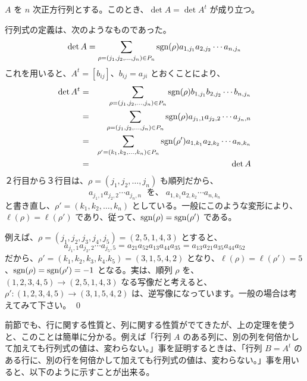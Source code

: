 \begin{thm} \label{thm:detoftranspose}
$A$ を $n$ 次正方行列とする。このとき、$\det A = \det A^t$ が成り立つ。
\end{thm}
\proof
行列式の定義は、次のようなものであった。
$$\det A = \sum_{\rho = (j_1,j_2,\ldots,j_n)\in P_n} \mbox{{\rm sgn}}(\rho)a_{1,j_1}a_{2,j_2}\cdots a_{n,j_n}$$
これを用いると、$A^t=[b_{ij}]$、$b_{ij}=a_{ji}$ とおくことにより、
\begin{eqnarray*}
\det A^t & = & \sum_{\rho = (j_1,j_2,\ldots,j_n)\in P_n} \mbox{{\rm sgn}}(\rho)b_{1,j_1}b_{2,j_2}\cdots b_{n,j_n}\\
& = & \sum_{\rho = (j_1,j_2,\ldots,j_n)\in P_n} \mbox{{\rm sgn}}(\rho)a_{j_1,1}a_{j_2,2}\cdots a_{j_n,n}\\
& = & \sum_{\rho' = (k_1,k_2,\ldots,k_n)\in P_n} \mbox{{\rm sgn}}(\rho')a_{1,k_1}a_{2,k_2}\cdots a_{n,k_n}\\
& = & \det A
\end{eqnarray*}
２行目から３行目は、$\rho = (j_1,j_2,\ldots,j_n)$ も順列だから、
$$a_{j_1,1}a_{j_2,2}\cdots a_{j_n,n}\;\mbox{ を、}\;a_{1,k_1}a_{2,k_2}\cdots a_{n,k_n}$$
と書き直し、$\rho' =(k_1,k_2,\ldots,k_n)$ としている。一般にこのような変形により、$\ell(\rho) = \ell(\rho')$ であり、従って、$\mbox{{\rm sgn}}(\rho) = \mbox{{\rm sgn}}(\rho')$ である。

例えば、$\rho = (j_1,j_2,j_3,j_4,j_5) = (2,5,1,4,3)$ とすると、
$$a_{j_1,1}a_{j_2,2}\cdots a_{j_5,5} = a_{21}a_{52}a_{13}a_{44}a_{35} = a_{13}a_{21}a_{35}a_{44}a_{52}$$
だから、$\rho' = (k_1,k_2,k_3,k_4.k_5) = (3,1,5,4,2)$ となり、$\ell(\rho) = \ell(\rho') = 5$、$\mbox{{\rm sgn}}(\rho) = \mbox{{\rm sgn}}(\rho') = -1$ となる。実は、順列 $\rho$ を、$(1,2,3,4,5)\to(2,5,1,4,3)$ なる写像だと考えると、$\rho': (1,2,3,4,5)\to(3,1,5,4,2)$ は、逆写像になっています。一般の場合は考えてみて下さい。
\qed

\medskip
前節でも、行に関する性質と、列に関する性質がでてきたが、上の定理を使うと、このことは簡単に分かる。例えば「行列 $A$ のある列に、別の列を何倍かして加えても行列式の値は、変わらない。」事を証明するときは、「行列 $B = A^t$ のある行に、別の行を何倍かして加えても行列式の値は、変わらない。」事を用いると、以下のように示すことが出来る。

